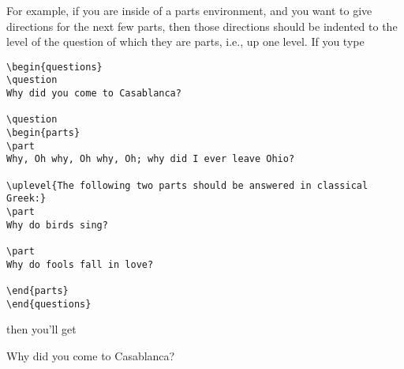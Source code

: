 \documentclass[12pt]{exam}
\begin{document}
For example, if you are inside of a parts environment, and you want
to give directions for the next few parts, then those directions
should be indented to the level of the question of which they are
parts, i.e., up one level.  If you type
%
\begin{verbatim}
\begin{questions}
\question
Why did you come to Casablanca?

\question
\begin{parts}
\part
Why, Oh why, Oh why, Oh; why did I ever leave Ohio?

\uplevel{The following two parts should be answered in classical
Greek:}
\part
Why do birds sing?

\part
Why do fools fall in love?

\end{parts}
\end{questions}
\end{verbatim}
%
then you'll get
\begin{questions}
\question
Why did you come to Casablanca?


\question
{}
\end{questions}
\end{document}
